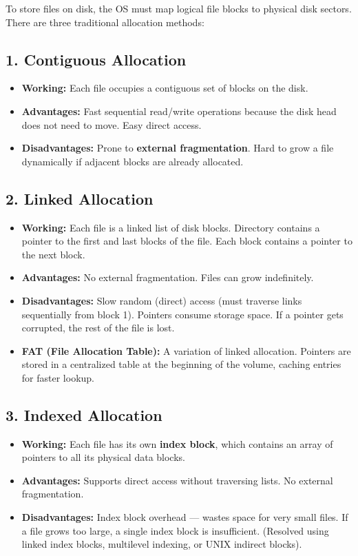 \documentclass[12pt,a4paper]{article}
\begin{document}
To store files on disk, the OS must map logical file blocks to physical disk sectors. There are three traditional allocation methods:

\subsection{1. Contiguous Allocation}
\begin{itemize}[leftmargin=*, itemsep=3pt]
  \item \textbf{Working:} Each file occupies a contiguous set of blocks on the disk.
  \item \textbf{Advantages:} Fast sequential read/write operations because the disk head does not need to move. Easy direct access.
  \item \textbf{Disadvantages:} Prone to \textbf{external fragmentation}. Hard to grow a file dynamically if adjacent blocks are already allocated.
\end{itemize}

\subsection{2. Linked Allocation}
\begin{itemize}[leftmargin=*, itemsep=3pt]
  \item \textbf{Working:} Each file is a linked list of disk blocks. Directory contains a pointer to the first and last blocks of the file. Each block contains a pointer to the next block.
  \item \textbf{Advantages:} No external fragmentation. Files can grow indefinitely.
  \item \textbf{Disadvantages:} Slow random (direct) access (must traverse links sequentially from block 1). Pointers consume storage space. If a pointer gets corrupted, the rest of the file is lost.
  \item \textbf{FAT (File Allocation Table):} A variation of linked allocation. Pointers are stored in a centralized table at the beginning of the volume, caching entries for faster lookup.
\end{itemize}

\subsection{3. Indexed Allocation}
\begin{itemize}[leftmargin=*, itemsep=3pt]
  \item \textbf{Working:} Each file has its own \textbf{index block}, which contains an array of pointers to all its physical data blocks.
  \item \textbf{Advantages:} Supports direct access without traversing lists. No external fragmentation.
  \item \textbf{Disadvantages:} Index block overhead --- wastes space for very small files. If a file grows too large, a single index block is insufficient. (Resolved using linked index blocks, multilevel indexing, or UNIX indirect blocks).
\end{itemize}
\end{document}

